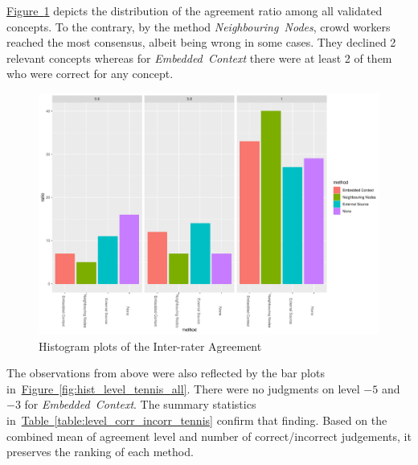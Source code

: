 \hyperref[fig:hist_agreement_tennis_all]{Figure~\ref*{fig:hist_agreement_tennis_all}} depicts the distribution of the agreement ratio among all validated concepts. To the contrary, by the method \emph{Neighbouring~Nodes}, crowd workers reached the most consensus, albeit being wrong in some cases. They declined 2 relevant concepts whereas for \emph{Embedded~Context} there were at least 2 of them who were correct for any concept. 
\begin{figure}
  	 \includegraphics[width=\textwidth]{plots/tennis/hist_agreement}
  	 \caption{Histogram plots of the Inter-rater Agreement}\label{fig:hist_agreement_tennis_all}
\end{figure}

The observations from above were also reflected by the bar plots in~\hyperref[fig:hist_level_tennis_all]{Figure~\ref*{fig:hist_level_tennis_all}}. 
There were no judgments on level $-5$ and $-3$ for \emph{Embedded~Context}.
The summary statistics in~\hyperref[table:level_corr_incorr_tennis]{Table~\ref*{table:level_corr_incorr_tennis}} confirm that finding. Based on the 
combined mean of agreement level and number of correct/incorrect judgements, it preserves the ranking of each method. 
 
